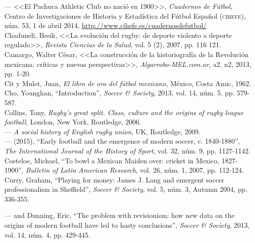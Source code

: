 \documentclass[11pt,a5paper,twoside]{book} %
\begin{document}
\begin{hangparas}{1cm}{1}
\noindent --- <<El Pachuca Athletic Club no nació en 1900>>, \emph{Cuadernos de Fútbol}, Centro de Investigaciones de Historia y Estadística del Fútbol Español (\textsc{cihefe}), núm. 53, 1 de abril 2014, \url{http://www.cihefe.es/cuadernosdefutbol/} \\

\noindent Chaduneli, Besik, <<La evolución del rugby: de deporte violento a deporte regulado>>, \emph{Revista Ciencias de la Salud}, vol. 5 (2), 2007, pp. 116 121. \\

\noindent Camargo, Walter César, <<La construcción de la historiografía de la Revolución mexicana: críticas y nuevas perspectivas>>, \emph{Algarrobo-MEL.com.ar}, a2, n2, 2013, pp. 1-20. \\

\noindent Cit y Mulet, Juan, \emph{El libro de oro del fútbol mexicano}, México, Costa Amic, 1962. \\

\noindent Cho, Younghan, “Introduction”, \emph{Soccer \& Society}, 2013, vol. 14, núm. 5, pp. 579-587. \\

\noindent Collins, Tony, \emph{Rugby's great split. Class, culture and the origins of rugby league football}, London, New York, Routledge, 2006. \\

\noindent --- \emph{A social history of English rugby union}, UK, Routledge, 2009. \\

\noindent --- (2015), “Early football and the emergence of modern soccer, c. 1840-1880”,
\emph{The International Journal of the History of Sport}, vol. 32, núm. 9, pp. 1127-1142. \\

\noindent Costeloe, Michael, “To bowl a Mexican Maiden over: cricket in Mexico, 1827-1900”,
\emph{Bulletin of Latin American Research}, vol. 26, núm. 1, 2007, pp. 112-124. \\

\noindent Curry, Graham, “Playing for money: James J. Lang and emergent soccer professionalism in Sheffield”, \emph{Soccer \& Society}, vol. 5, núm. 3, Autumn 2004, pp. 336-355. \\

\pagebreak

\noindent --- and Dunning, Eric, “The problem with revisionism: how new data on the origins of modern football have led to hasty conclusions”, \emph{Soccer \& Society}, 2013, vol. 14, núm. 4, pp. 429-445. \\


\end{hangparas}
\end{document}
